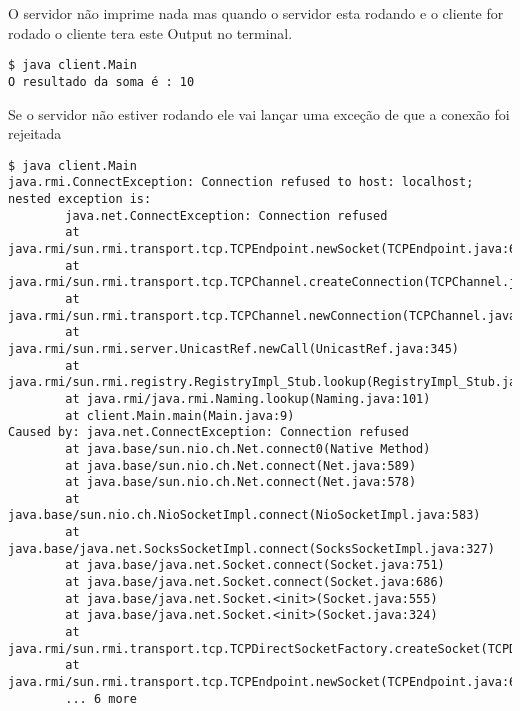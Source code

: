 \documentclass[12pt]{article}
\begin{document}
O servidor não imprime nada mas quando o servidor esta rodando e o cliente for rodado
o cliente tera este Output no terminal.

\begin{Verbatim}
$ java client.Main 
O resultado da soma é : 10
\end{Verbatim}

Se o servidor não estiver rodando ele vai lançar uma exceção de que a conexão foi rejeitada

\begin{Verbatim}[breaklines=true, breakanywhere=false]
$ java client.Main
java.rmi.ConnectException: Connection refused to host: localhost; nested exception is: 
        java.net.ConnectException: Connection refused
        at java.rmi/sun.rmi.transport.tcp.TCPEndpoint.newSocket(TCPEndpoint.java:625)
        at java.rmi/sun.rmi.transport.tcp.TCPChannel.createConnection(TCPChannel.java:217)
        at java.rmi/sun.rmi.transport.tcp.TCPChannel.newConnection(TCPChannel.java:204)
        at java.rmi/sun.rmi.server.UnicastRef.newCall(UnicastRef.java:345)
        at java.rmi/sun.rmi.registry.RegistryImpl_Stub.lookup(RegistryImpl_Stub.java:116)
        at java.rmi/java.rmi.Naming.lookup(Naming.java:101)
        at client.Main.main(Main.java:9)
Caused by: java.net.ConnectException: Connection refused
        at java.base/sun.nio.ch.Net.connect0(Native Method)
        at java.base/sun.nio.ch.Net.connect(Net.java:589)
        at java.base/sun.nio.ch.Net.connect(Net.java:578)
        at java.base/sun.nio.ch.NioSocketImpl.connect(NioSocketImpl.java:583)
        at java.base/java.net.SocksSocketImpl.connect(SocksSocketImpl.java:327)
        at java.base/java.net.Socket.connect(Socket.java:751)
        at java.base/java.net.Socket.connect(Socket.java:686)
        at java.base/java.net.Socket.<init>(Socket.java:555)
        at java.base/java.net.Socket.<init>(Socket.java:324)
        at java.rmi/sun.rmi.transport.tcp.TCPDirectSocketFactory.createSocket(TCPDirectSocketFactory.java:40)
        at java.rmi/sun.rmi.transport.tcp.TCPEndpoint.newSocket(TCPEndpoint.java:619)
        ... 6 more
\end{Verbatim}
\end{document}
